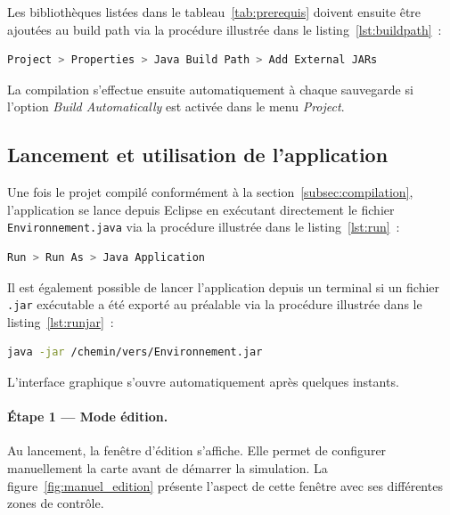 Les bibliothèques listées dans le tableau~\ref{tab:prerequis} doivent ensuite être
ajoutées au build path via la procédure illustrée dans le listing~\ref{lst:buildpath}~:

\begin{lstlisting}[style=java, language=bash, label=lst:buildpath,
    caption={Ajout des bibliothèques au build path}]
Project > Properties > Java Build Path > Add External JARs
\end{lstlisting}

La compilation s'effectue ensuite automatiquement à chaque sauvegarde si l'option
\textit{Build Automatically} est activée dans le menu \textit{Project}.

\subsection{Lancement et utilisation de l'application}
\label{subsec:lancement}

Une fois le projet compilé conformément à la section~\ref{subsec:compilation},
l'application se lance depuis Eclipse en exécutant directement le fichier
\texttt{Environnement.java} via la procédure illustrée dans le
listing~\ref{lst:run}~:

\begin{lstlisting}[style=java, language=bash, label=lst:run,
    caption={Lancement de l'application depuis Eclipse}]
Run > Run As > Java Application
\end{lstlisting}

Il est également possible de lancer l'application depuis un terminal si un fichier
\texttt{.jar} exécutable a été exporté au préalable via
la procédure illustrée dans le listing~\ref{lst:runjar}~:

\begin{lstlisting}[style=java, language=bash, label=lst:runjar,
    caption={Lancement de l'application depuis un terminal}]
java -jar /chemin/vers/Environnement.jar
\end{lstlisting}

L'interface graphique s'ouvre automatiquement après quelques instants.

\paragraph{Étape 1 — Mode édition.}
Au lancement, la fenêtre d'édition s'affiche. Elle permet de configurer manuellement
la carte avant de démarrer la simulation. La figure~\ref{fig:manuel_edition}
présente l'aspect de cette fenêtre avec ses différentes zones de contrôle.

